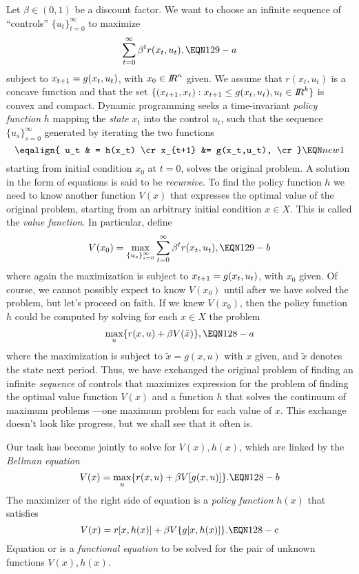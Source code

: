   Let $\beta \in (0,1)$ be a discount
factor. %
  We want to choose an infinite
sequence of ``controls'' $\{u_t\}_{t=0}^\infty$ to maximize
$$ \sum_{t=0}^\infty \be^t r(x_t,u_t),\EQN 129-a$$
subject to $x_{{t+1}} =g(x_t,u_t)$, with $x_0\in {I\kern-0.3em R}^n$ given.
We assume that $r(x_t,u_t)$ is a concave function and that the set
$\{(x_{t+1}, x_t): x_{t+1} \le g(x_t,u_t), u_t \allowbreak \in
{I\kern-0.3em R}^k\}$ is convex and compact. Dynamic programming seeks a
time-invariant {\it policy function\/} $h$ mapping
%
%
the {\it state\/} $x_t$ into the control $u_t$, such that
the sequence $\{u_s\}_{s=0}^\infty$ generated by iterating the
two functions
$$\eqalign{ u_t & = h(x_t) \cr
            x_{t+1} &= g(x_t,u_t), \cr} \EQN new1 $$
starting from initial condition $x_0$ at $t=0$, solves the original problem.
 A solution in the form of equations  is said
to be {\it recursive}.
To find the policy function $h$ we need to know another function
$V(x)$ that expresses the optimal value of the original problem, starting
from an arbitrary initial condition $x\in X$.
This is called the {\it value function}. In particular,  
define
$$V(x_0)=\max_{\{u_s\}_{s=0}^\infty} \sum_{t=0}^\infty \be^t
r(x_t,u_t),\EQN 129-b$$
where again the maximization is subject to $x_{{t+1}} =g(x_t,u_t)$,
with $x_0$ given.   Of course,  we cannot possibly
expect to know $V(x_0)$ until after we have solved
the problem, but let's proceed on faith. If we knew $V(x_0)$, then
 the policy function $h$ could be computed by
solving for each $x \in X$ the problem
$$\max_u \{r(x,u)+\be V(\tilde x)\},\EQN 128-a$$
where the maximization is subject to $\tilde x=g(x,u)$ with $x$ given, and
$\tilde x$ denotes the state next period.
Thus, we have exchanged the original
 problem of finding an infinite {\it sequence\/}
of controls that maximizes expression  for the problem
of finding the optimal value function $V(x)$ and a function $h$ that solves
the continuum of maximum problems ---one maximum
problem for each value of $x$.
This exchange doesn't look like progress, but
we shall see that it often is.



Our task has become jointly to solve for $V(x),h(x)$, which
are linked by the {\it Bellman equation}
$$V(x) =\max_u \{r(x,u)+\be V[g(x,u)]\}. \EQN 128-b$$
The maximizer of the right side of equation  is  a
{\it policy function} $h(x)$ that satisfies
$$V(x)=r[x,h(x)]+\beta V\{g[x,h(x)]\}.\EQN 128-c$$
Equation  or
 is a {\it functional equation} to be solved for the
pair of unknown functions $V(x), h(x)$.

